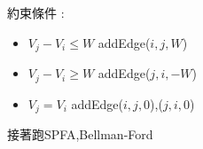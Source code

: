 約束條件 : 
\begin{itemize}
    \item $V_j-V_i\le W$ addEdge($i, j, W $)
    \item $V_j-V_i\ge W$ addEdge($j, i, -W $)
    \item $V_j = V_i$ addEdge($i, j, 0 $),($j, i, 0 $)
\end{itemize}

接著跑SPFA,Bellman-Ford